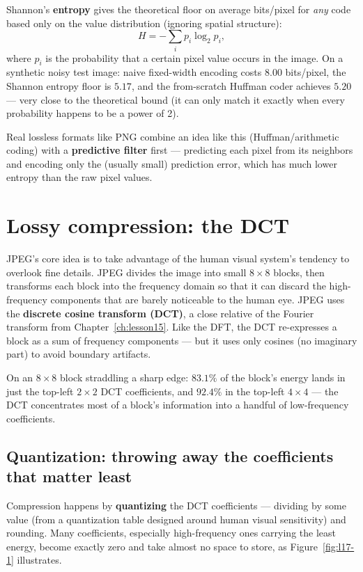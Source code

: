 Shannon's \textbf{entropy} gives the theoretical floor on average bits/pixel for \emph{any} code based only on the value distribution (ignoring spatial structure):
\begin{equation}
H = -\sum_i p_i \log_2 p_i,
\end{equation}
where $p_i$ is the probability that a certain pixel value occurs in the image. On a synthetic noisy test image: naive fixed-width encoding costs $8.00$ bits/pixel, the Shannon entropy floor is $5.17$, and the from-scratch Huffman coder achieves $5.20$ --- very close to the theoretical bound (it can only match it exactly when every probability happens to be a power of 2).

Real lossless formats like PNG combine an idea like this (Huffman/arithmetic coding) with a \textbf{predictive filter} first --- predicting each pixel from its neighbors and encoding only the (usually small) prediction error, which has much lower entropy than the raw pixel values.

\section{Lossy compression: the DCT}

JPEG's core idea is to take advantage of the human visual system's tendency to overlook fine details. JPEG divides the image into small $8\times8$ blocks, then transforms each block into the frequency domain so that it can discard the high-frequency components that are barely noticeable to the human eye. JPEG uses the \textbf{discrete cosine transform (DCT)}, a close relative of the Fourier transform from Chapter~\ref{ch:lesson15}. Like the DFT, the DCT re-expresses a block as a sum of frequency components --- but it uses only cosines (no imaginary part) to avoid boundary artifacts.

On an $8\times8$ block straddling a sharp edge: $83.1\%$ of the block's energy lands in just the top-left $2\times2$ DCT coefficients, and $92.4\%$ in the top-left $4\times4$ --- the DCT concentrates most of a block's information into a handful of low-frequency coefficients.

\subsection*{Quantization: throwing away the coefficients that matter least}

Compression happens by \textbf{quantizing} the DCT coefficients --- dividing by some value (from a quantization table designed around human visual sensitivity) and rounding. Many coefficients, especially high-frequency ones carrying the least energy, become exactly zero and take almost no space to store, as Figure~\ref{fig:l17-1} illustrates.

